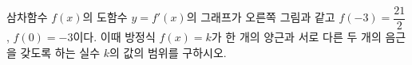 \noindent\begin{minipage}[t]{0.58\linewidth}\vspace{0pt}\raggedright 삼차함수 $f(x)$의 도함수 $y=f'(x)$의 그래프가 오른쪽 그림과 같고 $f(-3)=\dfrac{21}{2}$, $f(0)=-3$이다. 이때 방정식 $f(x)=k$가 한 개의 양근과 서로 다른 두 개의 음근을 갖도록 하는 실수 $k$의 값의 범위를 구하시오.\end{minipage}\hfill\begin{minipage}[t]{0.4\linewidth}\vspace{0pt}\centering \resizebox{\ifdim\width>\linewidth\linewidth\else\width\fi}{!}{}\end{minipage}\par
